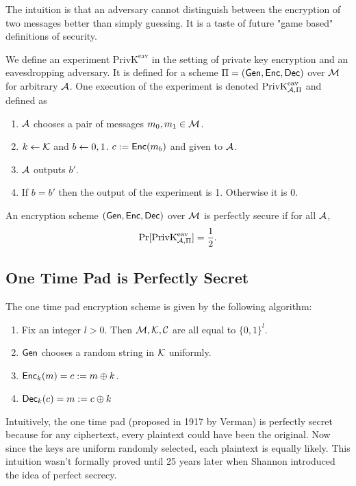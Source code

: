 \begin{definition}
    The intuition is that an adversary cannot distinguish between the encryption of two messages better than simply guessing. It is a taste of future "game based" definitions of security.

    We define an experiment $\text{PrivK}^\text{eav}$ in the setting of private key encryption and an eavesdropping adversary. It is defined for a scheme $\Pi = \EncScheme$ over $\MM$ for arbitrary $\AA$. One execution of the experiment is denoted $\text{PrivK}^\text{eav}_{\AA, \Pi}$ and defined as 
    \begin{enumerate}
        \item $\AA$ chooses a pair of messages $m_0, m_1 \in \MM$.
        \item $k \sampledfrom \KK$ and $b \sampledfrom {0, 1}$. $c := \Enc(m_b)$ and given to $\AA$.
        \item $\AA$ outputs  $b'$.
        \item If $b = b'$ then the output of the experiment is 1. Otherwise it is 0.
    \end{enumerate}
\end{definition}

\begin{lemma}
    An encryption scheme $\EncScheme$ over $\MM$ is perfectly secure if for all $\AA$,
    \[ \Pr[\text{PrivK}^\text{eav}_{\AA, \Pi}] = \frac{1}{2}. \]
\end{lemma}

\subsection{One Time Pad is Perfectly Secret}

The one time pad encryption scheme is given by the following algorithm:
\begin{enumerate}
    \item Fix an integer $l > 0$. Then $\MM, \KK, \CC$ are all equal to $\{0, 1\}^l$.
    \item $\Gen$ chooses a random string in $\KK$ uniformly.
    \item $\Enc_k(m) = c := m \xor k$.
    \item $\Dec_k(c) = m := c \xor k$
\end{enumerate}

Intuitively, the one time pad (proposed in 1917 by Verman) is perfectly secret because for any ciphertext, every plaintext could have been the original. Now since the keys are uniform randomly selected, each plaintext is equally likely. This intuition wasn't formally proved until 25 years later when Shannon introduced the idea of perfect secrecy.

